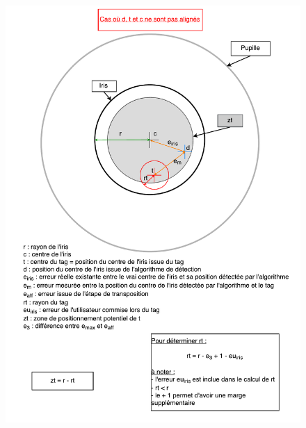 \documentclass[a4paper, 12pt]{report}
\begin{document}
    \begin{figure}
    \centering\includegraphics[height=24cm]{erreur_oeil_1.pdf}
    \end{figure}
\end{document}
